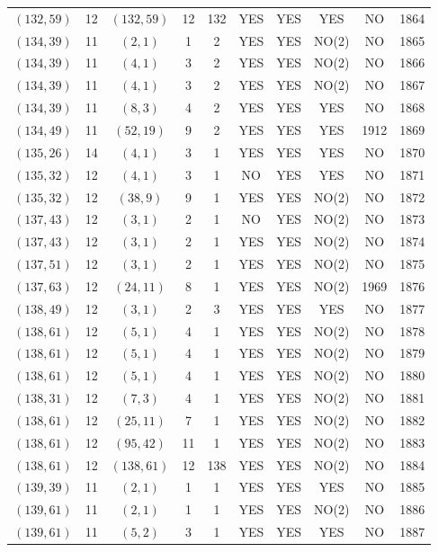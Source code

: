 \begin{longtable}{|c|c|c|c|c|c|c|c|c|c|}
$(132, 59)$ & 12 & $(132, 59)$ & 12 & 132 & YES & YES & YES & NO & 1864\\
$(134, 39)$ & 11 & $(2, 1)$ & 1 & 2 & YES & YES & NO(2) & NO & 1865\\
$(134, 39)$ & 11 & $(4, 1)$ & 3 & 2 & YES & YES & NO(2) & NO & 1866\\
$(134, 39)$ & 11 & $(4, 1)$ & 3 & 2 & YES & YES & NO(2) & NO & 1867\\
$(134, 39)$ & 11 & $(8, 3)$ & 4 & 2 & YES & YES & YES & NO & 1868\\
$(134, 49)$ & 11 & $(52, 19)$ & 9 & 2 & YES & YES & YES & 1912 & 1869\\
$(135, 26)$ & 14 & $(4, 1)$ & 3 & 1 & YES & YES & YES & NO & 1870\\
$(135, 32)$ & 12 & $(4, 1)$ & 3 & 1 & NO & YES & YES & NO & 1871\\
$(135, 32)$ & 12 & $(38, 9)$ & 9 & 1 & YES & YES & NO(2) & NO & 1872\\
$(137, 43)$ & 12 & $(3, 1)$ & 2 & 1 & NO & YES & NO(2) & NO & 1873\\
$(137, 43)$ & 12 & $(3, 1)$ & 2 & 1 & YES & YES & NO(2) & NO & 1874\\
$(137, 51)$ & 12 & $(3, 1)$ & 2 & 1 & YES & YES & NO(2) & NO & 1875\\
$(137, 63)$ & 12 & $(24, 11)$ & 8 & 1 & YES & YES & NO(2) & 1969 & 1876\\
$(138, 49)$ & 12 & $(3, 1)$ & 2 & 3 & YES & YES & YES & NO & 1877\\
$(138, 61)$ & 12 & $(5, 1)$ & 4 & 1 & YES & YES & NO(2) & NO & 1878\\
$(138, 61)$ & 12 & $(5, 1)$ & 4 & 1 & YES & YES & NO(2) & NO & 1879\\
$(138, 61)$ & 12 & $(5, 1)$ & 4 & 1 & YES & YES & NO(2) & NO & 1880\\
$(138, 31)$ & 12 & $(7, 3)$ & 4 & 1 & YES & YES & NO(2) & NO & 1881\\
$(138, 61)$ & 12 & $(25, 11)$ & 7 & 1 & YES & YES & NO(2) & NO & 1882\\
$(138, 61)$ & 12 & $(95, 42)$ & 11 & 1 & YES & YES & NO(2) & NO & 1883\\
$(138, 61)$ & 12 & $(138, 61)$ & 12 & 138 & YES & YES & NO(2) & NO & 1884\\
$(139, 39)$ & 11 & $(2, 1)$ & 1 & 1 & YES & YES & YES & NO & 1885\\
$(139, 61)$ & 11 & $(2, 1)$ & 1 & 1 & YES & YES & NO(2) & NO & 1886\\
$(139, 61)$ & 11 & $(5, 2)$ & 3 & 1 & YES & YES & YES & NO & 1887\\

\end{longtable}
